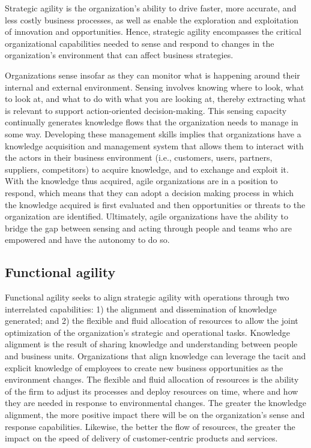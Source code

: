 \documentclass[
  letterpaper,
  DIV=11,
  numbers=noendperiod]{scrreprt}
\begin{document}
Strategic agility is the organization's ability to drive faster, more
accurate, and less costly business processes, as well as enable the
exploration and exploitation of innovation and opportunities. Hence,
strategic agility encompasses the critical organizational capabilities
needed to sense and respond to changes in the organization's environment
that can affect business strategies.

Organizations sense insofar as they can monitor what is happening around
their internal and external environment. Sensing involves knowing where
to look, what to look at, and what to do with what you are looking at,
thereby extracting what is relevant to support action-oriented
decision-making. This sensing capacity continually generates knowledge
flows that the organization needs to manage in some way. Developing
these management skills implies that organizations have a knowledge
acquisition and management system that allows them to interact with the
actors in their business environment (i.e., customers, users, partners,
suppliers, competitors) to acquire knowledge, and to exchange and
exploit it. With the knowledge thus acquired, agile organizations are in
a position to respond, which means that they can adopt a decision making
process in which the knowledge acquired is first evaluated and then
opportunities or threats to the organization are identified. Ultimately,
agile organizations have the ability to bridge the gap between sensing
and acting through people and teams who are empowered and have the
autonomy to do so.

\hypertarget{functional-agility}{%
\subsection{Functional agility}\label{functional-agility}}

Functional agility seeks to align strategic agility with operations
through two interrelated capabilities: 1) the alignment and
dissemination of knowledge generated; and 2) the flexible and fluid
allocation of resources to allow the joint optimization of the
organization's strategic and operational tasks. Knowledge alignment is
the result of sharing knowledge and understanding between people and
business units. Organizations that align knowledge can leverage the
tacit and explicit knowledge of employees to create new business
opportunities as the environment changes. The flexible and fluid
allocation of resources is the ability of the firm to adjust its
processes and deploy resources on time, where and how they are needed in
response to environmental changes. The greater the knowledge alignment,
the more positive impact there will be on the organization's sense and
response capabilities. Likewise, the better the flow of resources, the
greater the impact on the speed of delivery of customer-centric products
and services.
\end{document}
